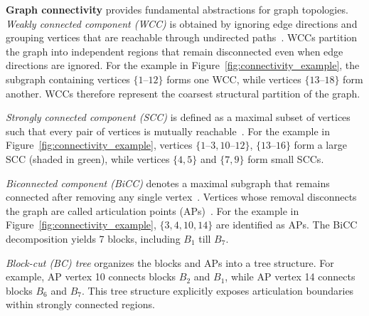 

\textbf{Graph connectivity}
provides fundamental abstractions for graph topologies.
\textit{Weakly connected component (WCC)}
is obtained by ignoring edge directions and grouping vertices that are reachable through undirected paths~\cite{vishkin1982log}.
WCCs partition the graph into independent regions that remain disconnected even when edge directions are ignored.
For the example in Figure~\ref{fig:connectivity_example}, the subgraph containing vertices $\{1\text{--}12\}$ forms one WCC, while vertices $\{13\text{--}18\}$ form another.
WCCs therefore represent the coarsest structural partition of the graph.

\textit{Strongly connected component (SCC)} 
is defined as a maximal subset of vertices such that every pair of vertices is mutually reachable~\cite{sharir1981strong}.
For the example in Figure~\ref{fig:connectivity_example}, vertices $\{1\text{--}3,10\text{--}12\}$, $\{13\text{--}16\}$ form a large SCC (shaded in green), while vertices $\{4,5\}$ and $\{7,9\}$ form small SCCs.

\textit{Biconnected component (BiCC)}
denotes a maximal subgraph that remains connected after removing any single vertex~\cite{westbrook1992maintaining}.
Vertices whose removal disconnects the graph are called articulation points (APs)~\cite{hopcroft1973algorithm}.
For the example in Figure~\ref{fig:connectivity_example},  $\{3,4,10,14\}$ are identified as APs.
The BiCC decomposition yields 7 blocks, including $B_1$ till $B_7$.

\textit{Block-cut (BC) tree} organizes the 
blocks and APs into a tree structure.
For example, AP vertex 10 connects blocks $B_2$ and $B_1$, while AP vertex 14 connects blocks $B_6$ and $B_7$.
This tree structure explicitly exposes articulation boundaries within strongly connected regions.

